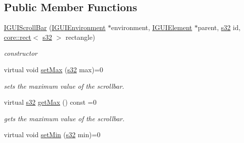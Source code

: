 \subsection*{Public Member Functions}
\begin{DoxyCompactItemize}
\item 
\mbox{\label{classirr_1_1gui_1_1IGUIScrollBar_a350c657e1cd95ddb566570e7759ff886}} 
\hyperlink{classirr_1_1gui_1_1IGUIScrollBar_a350c657e1cd95ddb566570e7759ff886}{I\+G\+U\+I\+Scroll\+Bar} (\hyperlink{classirr_1_1gui_1_1IGUIEnvironment}{I\+G\+U\+I\+Environment} $\ast$environment, \hyperlink{classirr_1_1gui_1_1IGUIElement}{I\+G\+U\+I\+Element} $\ast$parent, \hyperlink{namespaceirr_ac66849b7a6ed16e30ebede579f9b47c6}{s32} id, \hyperlink{classirr_1_1core_1_1rect}{core\+::rect}$<$ \hyperlink{namespaceirr_ac66849b7a6ed16e30ebede579f9b47c6}{s32} $>$ rectangle)
\begin{DoxyCompactList}\small\item\em constructor \end{DoxyCompactList}\item 
\mbox{\label{classirr_1_1gui_1_1IGUIScrollBar_a0d07ab631a8aa6e8edbdfa65250cd556}} 
virtual void \hyperlink{classirr_1_1gui_1_1IGUIScrollBar_a0d07ab631a8aa6e8edbdfa65250cd556}{set\+Max} (\hyperlink{namespaceirr_ac66849b7a6ed16e30ebede579f9b47c6}{s32} max)=0
\begin{DoxyCompactList}\small\item\em sets the maximum value of the scrollbar. \end{DoxyCompactList}\item 
\mbox{\label{classirr_1_1gui_1_1IGUIScrollBar_af66eec810b46916d9bbe4aab58ecce95}} 
virtual \hyperlink{namespaceirr_ac66849b7a6ed16e30ebede579f9b47c6}{s32} \hyperlink{classirr_1_1gui_1_1IGUIScrollBar_af66eec810b46916d9bbe4aab58ecce95}{get\+Max} () const =0
\begin{DoxyCompactList}\small\item\em gets the maximum value of the scrollbar. \end{DoxyCompactList}\item 
\mbox{\label{classirr_1_1gui_1_1IGUIScrollBar_aa354a1c3f5b59192a5e516a312bfa20f}} 
virtual void \hyperlink{classirr_1_1gui_1_1IGUIScrollBar_aa354a1c3f5b59192a5e516a312bfa20f}{set\+Min} (\hyperlink{namespaceirr_ac66849b7a6ed16e30ebede579f9b47c6}{s32} min)=0

\end{DoxyCompactItemize}
